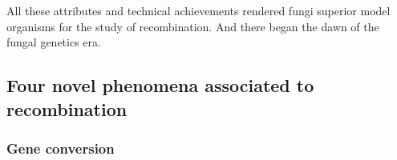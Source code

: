 %


All these attributes and technical achievements rendered fungi superior model organisms for the study of recombination. And there began the dawn of the fungal genetics era.







\subsection{Four novel phenomena associated to recombination}

\subsubsection{Gene conversion}

%

